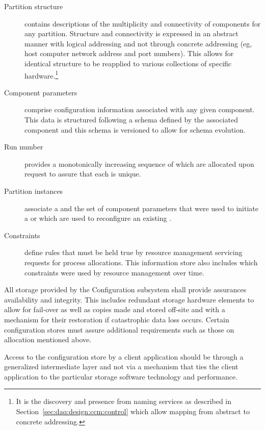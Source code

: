 \begin{description}

\item[Partition structure] contains descriptions of the multiplicity and connectivity of  components for any partition. 
  Structure and connectivity is expressed in an abstract manner with logical addressing and not through concrete addressing (eg, host computer network address and port numbers). 
  This allows for identical structure to be reapplied to various collections of specific hardware.\footnote{It is the discovery and presence from naming services as described in Section~\ref{sec:daq:design:ccm:control} which allow mapping from abstract to concrete addressing.}

\item[Component parameters] comprise configuration information associated with any given  component.  This data is structured following a schema defined by the associated component and this schema is versioned to allow for schema evolution.

\item[Run number] provides a monotonically increasing sequence of  which are allocated upon request to assure that each is unique.

\item[Partition instances] associate a  and the set of component parameters that were used to initiate a  or which are used to reconfigure an existing .  

\item[Constraints] define rules that must be held true by resource management servicing requests for process allocations.  This information store also includes which constraints were used by resource management over time.
\end{description}


All storage provided by the Configuration subsystem shall provide assurances availability and integrity. 
This includes redundant storage hardware elements to allow for fail-over as well as copies made and stored off-site and with a mechanism for their restoration if catastrophic data loss occurs.
Certain configuration stores must assure additional requirements such as those on  allocation mentioned above.

Access to the configuration store by a client application should be through a generalized intermediate layer and not via a mechanism that ties the client application to the particular storage software technology and performance.

